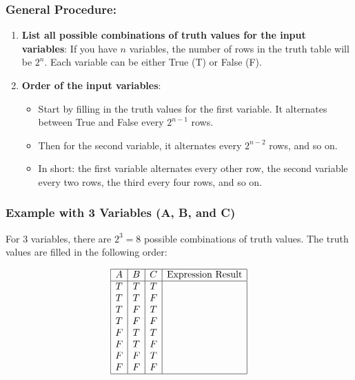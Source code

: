 \subsubsection{General Procedure:}
\begin{enumerate}
	\item \textbf{List all possible combinations of truth values for the input variables}: If you have \(n\) variables, the number of rows in the truth table will be \(2^n\). Each variable can be either True (T) or False (F).

	\item \textbf{Order of the input variables}:
	      \begin{itemize}
		      \item Start by filling in the truth values for the first variable. It alternates between True and False every \(2^{n-1}\) rows.
		      \item Then for the second variable, it alternates every \(2^{n-2}\) rows, and so on.
		      \item In short: the first variable alternates every other row, the second variable every two rows, the third every four rows, and so on.
	      \end{itemize}
\end{enumerate}

\subsubsection{Example with 3 Variables (A, B, and C)}

For 3 variables, there are \(2^3 = 8\) possible combinations of truth values. The truth values are filled in the following order:

\[
	\begin{array}{|c|c|c|c|}
		\hline
		A & B & C & \text{Expression Result} \\
		\hline
		T & T & T &                          \\
		T & T & F &                          \\
		T & F & T &                          \\
		T & F & F &                          \\
		F & T & T &                          \\
		F & T & F &                          \\
		F & F & T &                          \\
		F & F & F &                          \\
		\hline
	\end{array}
\]

